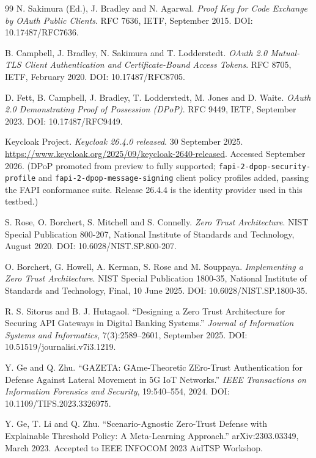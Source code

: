 \begin{thebibliography}{99}
 N. Sakimura (Ed.), J. Bradley and N. Agarwal. \textit{Proof Key for Code Exchange by OAuth Public Clients}. RFC 7636, IETF, September 2015. DOI: 10.17487/RFC7636.

 B. Campbell, J. Bradley, N. Sakimura and T. Lodderstedt. \textit{OAuth 2.0 Mutual-TLS Client Authentication and Certificate-Bound Access Tokens}. RFC 8705, IETF, February 2020. DOI: 10.17487/RFC8705.

 D. Fett, B. Campbell, J. Bradley, T. Lodderstedt, M. Jones and D. Waite. \textit{OAuth 2.0 Demonstrating Proof of Possession (DPoP)}. RFC 9449, IETF, September 2023. DOI: 10.17487/RFC9449.

 Keycloak Project. \textit{Keycloak 26.4.0 released}. 30 September 2025. \url{https://www.keycloak.org/2025/09/keycloak-2640-released}. Accessed September 2026. (DPoP promoted from preview to fully supported; \texttt{fapi-2-dpop-security-profile} and \texttt{fapi-2-dpop-message-signing} client policy profiles added, passing the FAPI conformance suite. Release 26.4.4 is the identity provider used in this testbed.)

 S. Rose, O. Borchert, S. Mitchell and S. Connelly. \textit{Zero Trust Architecture}. NIST Special Publication 800-207, National Institute of Standards and Technology, August 2020. DOI: 10.6028/NIST.SP.800-207.

 O. Borchert, G. Howell, A. Kerman, S. Rose and M. Souppaya. \textit{Implementing a Zero Trust Architecture}. NIST Special Publication 1800-35, National Institute of Standards and Technology, Final, 10 June 2025. DOI: 10.6028/NIST.SP.1800-35.

 R. S. Sitorus and B. J. Hutagaol. ``Designing a Zero Trust Architecture for Securing API Gateways in Digital Banking Systems.'' \textit{Journal of Information Systems and Informatics}, 7(3):2589--2601, September 2025. DOI: 10.51519/journalisi.v7i3.1219.

 Y. Ge and Q. Zhu. ``GAZETA: GAme-Theoretic ZEro-Trust Authentication for Defense Against Lateral Movement in 5G IoT Networks.'' \textit{IEEE Transactions on Information Forensics and Security}, 19:540--554, 2024. DOI: 10.1109/TIFS.2023.3326975.

 Y. Ge, T. Li and Q. Zhu. ``Scenario-Agnostic Zero-Trust Defense with Explainable Threshold Policy: A Meta-Learning Approach.'' arXiv:2303.03349, March 2023. Accepted to IEEE INFOCOM 2023 AidTSP Workshop.


\end{thebibliography}
